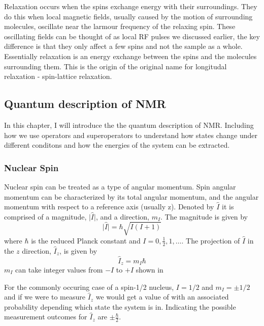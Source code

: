 Relaxation occurs when the spins exchange energy with their surroundings. They do
this when local magnetic fields, usually caused by the motion of surrounding molecules, oscillate
near the larmour frequency of the relaxing spin. These oscillating fields can be thought of
as local RF pulses we discussed earlier, the key difference is that they only affect a few spins
and not the sample as a whole. Essentially relaxation is an energy exchange between the
spins and the molecules surrounding them. This is the origin of the original name for longitudal
relaxation - spin-lattice relaxation.

\newpage

\subsection{Quantum description of NMR}\label{Quantum}

In this chapter, I will introduce the the quantum description of NMR. Including how
we use operators and superoperators to understand how states change under different conditons and how the energies of the system can be extracted.

\subsubsection{Nuclear Spin}

Nuclear spin can be treated as a type of angular momentum. Spin angular momentum can be characterized by its total
angular momentum, and the angular momentum with respect to a reference axis (usually z).  Denoted by $\hat{I}$
it is comprised of a magnitude, $\lvert\hat{I}\rvert$, and a direction, $m_I$.
The magnitude is given by
\begin{equation}
  \lvert\hat{I}\rvert = \hbar\sqrt{I(I+1)}
\end{equation}
where $\hbar$ is the reduced Planck constant and $I = 0,\frac{1}{2},1,\dots$. The projection of $\hat{I}$ in
the $z$ direction, $\hat{I}_{z}$, is given by
\begin{equation}
  \hat{I}_{z} = m_I\hbar
\end{equation}
$m_{I}$ can take integer values from $-I$ to $+I$ shown in 

For the commonly occuring case of a spin-1/2 nucleus, $I=1/2$ and $m_I = ±1/2$ and if we were to measure $\hat{I}_z$ we would get a value of  with an associated probability depending which state the system is in. Indicating the possible measurement outcomes for $\hat{I}_z$ are $±\frac{\hbar}{2}$.

